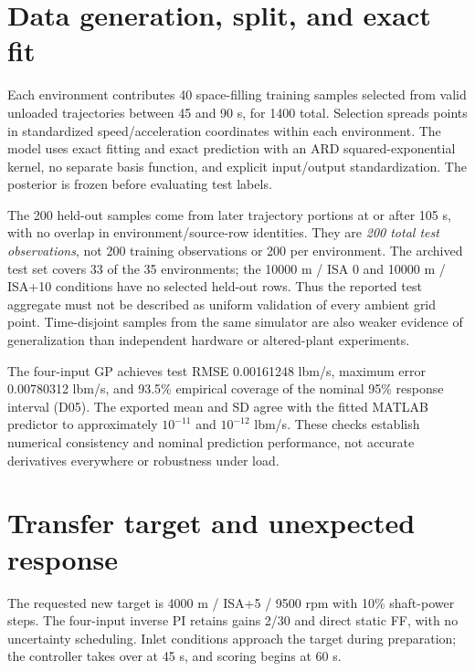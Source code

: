 \section{Data generation, split, and exact fit}
Each environment contributes 40 space-filling training samples selected from valid unloaded trajectories between 45 and 90 s, for 1400 total. Selection spreads points in standardized speed/acceleration coordinates within each environment. The model uses exact fitting and exact prediction with an ARD squared-exponential kernel, no separate basis function, and explicit input/output standardization. The posterior is frozen before evaluating test labels.

The 200 held-out samples come from later trajectory portions at or after 105 s, with no overlap in environment/source-row identities. They are \emph{200 total test observations}, not 200 training observations or 200 per environment. The archived test set covers 33 of the 35 environments; the 10000 m / ISA 0 and 10000 m / ISA+10 conditions have no selected held-out rows. Thus the reported test aggregate must not be described as uniform validation of every ambient grid point. Time-disjoint samples from the same simulator are also weaker evidence of generalization than independent hardware or altered-plant experiments.


The four-input GP achieves test RMSE 0.00161248 lbm/s, maximum error 0.00780312 lbm/s, and 93.5\% empirical coverage of the nominal 95\% response interval (D05). The exported mean and SD agree with the fitted MATLAB predictor to approximately $10^{-11}$ and $10^{-12}$ lbm/s. These checks establish numerical consistency and nominal prediction performance, not accurate derivatives everywhere or robustness under load.

\section{Transfer target and unexpected response}
The requested new target is 4000 m / ISA+5 / 9500 rpm with 10\% shaft-power steps. The four-input inverse PI retains gains 2/30 and direct static FF, with no uncertainty scheduling. Inlet conditions approach the target during preparation; the controller takes over at 45 s, and scoring begins at 60 s.

